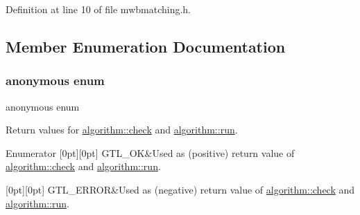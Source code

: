 Definition at line 10 of file mwbmatching.\+h.



\subsection{Member Enumeration Documentation}
\mbox{\label{classalgorithm_af1a0078e153aa99c24f9bdf0d97f6710}} 
\subsubsection{\texorpdfstring{anonymous enum}{anonymous enum}}
{\footnotesize\ttfamily anonymous enum\hspace{0.3cm}{\ttfamily [inherited]}}



Return values for \mbox{\hyperlink{classalgorithm_a76361fb03ad1cf643affc51821e43bed}{algorithm\+::check}} and \mbox{\hyperlink{classalgorithm_a734b189509a8d6b56b65f8ff772d43ca}{algorithm\+::run}}. 

\begin{DoxyEnumFields}{Enumerator}
[0pt][0pt]{}\mbox{\label{classalgorithm_af1a0078e153aa99c24f9bdf0d97f6710a5114c20e4a96a76b5de9f28bf15e282b}} 
G\+T\+L\+\_\+\+OK&Used as (positive) return value of \mbox{\hyperlink{classalgorithm_a76361fb03ad1cf643affc51821e43bed}{algorithm\+::check}} and \mbox{\hyperlink{classalgorithm_a734b189509a8d6b56b65f8ff772d43ca}{algorithm\+::run}}. \\
\hline

[0pt][0pt]{}\mbox{\label{classalgorithm_af1a0078e153aa99c24f9bdf0d97f6710a6fcf574690bbd6cf710837a169510dd7}} 
G\+T\+L\+\_\+\+E\+R\+R\+OR&Used as (negative) return value of \mbox{\hyperlink{classalgorithm_a76361fb03ad1cf643affc51821e43bed}{algorithm\+::check}} and \mbox{\hyperlink{classalgorithm_a734b189509a8d6b56b65f8ff772d43ca}{algorithm\+::run}}. \\
\hline

\end{DoxyEnumFields}


